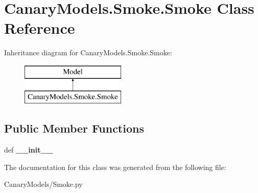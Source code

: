 \hypertarget{class_canary_models_1_1_smoke_1_1_smoke}{\section{Canary\-Models.\-Smoke.\-Smoke Class Reference}
\label{class_canary_models_1_1_smoke_1_1_smoke}
}
Inheritance diagram for Canary\-Models.\-Smoke.\-Smoke\-:\begin{figure}[H]
\begin{center}
\leavevmode
\includegraphics[height=2.000000cm]{class_canary_models_1_1_smoke_1_1_smoke}
\end{center}
\end{figure}
\subsection*{Public Member Functions}
\begin{DoxyCompactItemize}
\item 
\hypertarget{class_canary_models_1_1_smoke_1_1_smoke_a766f94eb787d6bb43280c98131fa127e}{def {\bfseries \-\_\-\-\_\-init\-\_\-\-\_\-}}\label{class_canary_models_1_1_smoke_1_1_smoke_a766f94eb787d6bb43280c98131fa127e}

\end{DoxyCompactItemize}


The documentation for this class was generated from the following file\-:\begin{DoxyCompactItemize}
\item 
Canary\-Models/Smoke.\-py\end{DoxyCompactItemize}
